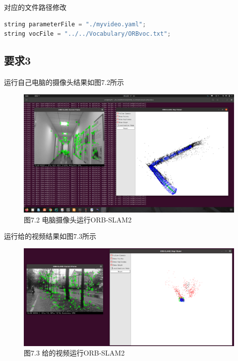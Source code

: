 \documentclass[40pt,a4paper，UTF8]{ctexart}
\begin{document}
对应的文件路径修改

\begin{lstlisting}[language=c++, caption=MyVideo/myslam.cpp部分修改]
string parameterFile = "./myvideo.yaml";
string vocFile = "../../Vocabulary/ORBvoc.txt";
\end{lstlisting}

\paragraph{}

\subsection{要求3} 
\paragraph{}
运行自己电脑的摄像头结果如图7.2所示
\begin{figure}[H]
\centering
\includegraphics[width=4.8in]{ch1_7_2.png} {图7.2 电脑摄像头运行ORB-SLAM2}
\end{figure}

运行给的视频结果如图7.3所示
\begin{figure}[H]
\centering
\includegraphics[width=4.8in]{ch1_7_3.png} {图7.3 给的视频运行ORB-SLAM2}
\end{figure}
\end{document}
